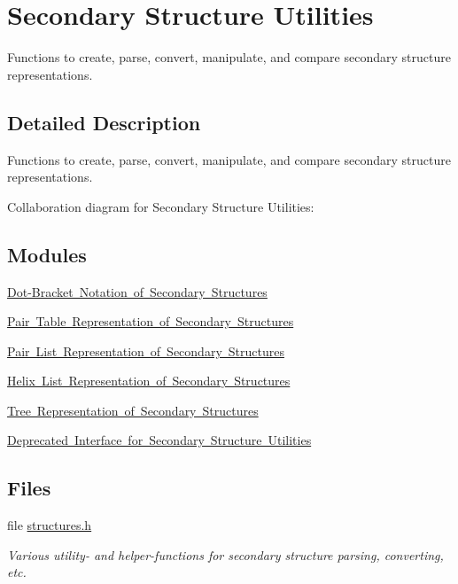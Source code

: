 \hypertarget{group__struct__utils}{}\section{Secondary Structure Utilities}
\label{group__struct__utils}


Functions to create, parse, convert, manipulate, and compare secondary structure representations.  




\subsection{Detailed Description}
Functions to create, parse, convert, manipulate, and compare secondary structure representations. 

Collaboration diagram for Secondary Structure Utilities\+:
\subsection*{Modules}
\begin{DoxyCompactItemize}
\item 
\mbox{\hyperlink{group__struct__utils__dot__bracket}{Dot-\/\+Bracket Notation of Secondary Structures}}
\item 
\mbox{\hyperlink{group__struct__utils__pair__table}{Pair Table Representation of Secondary Structures}}
\item 
\mbox{\hyperlink{group__struct__utils__plist}{Pair List Representation of Secondary Structures}}
\item 
\mbox{\hyperlink{group__struct__utils__helix__list}{Helix List Representation of Secondary Structures}}
\item 
\mbox{\hyperlink{group__struct__utils__tree}{Tree Representation of Secondary Structures}}
\item 
\mbox{\hyperlink{group__struct__utils__deprecated}{Deprecated Interface for Secondary Structure Utilities}}
\end{DoxyCompactItemize}
\subsection*{Files}
\begin{DoxyCompactItemize}
\item 
file \mbox{\hyperlink{utils_2structures_8h}{structures.\+h}}
\begin{DoxyCompactList}\small\item\em Various utility-\/ and helper-\/functions for secondary structure parsing, converting, etc. \end{DoxyCompactList}\end{DoxyCompactItemize}
